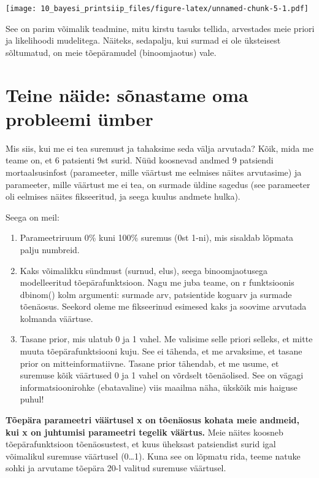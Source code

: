 \documentclass[]{book}
\begin{document}
\texttt{[image: 10\_bayesi\_printsiip\_files/figure-latex/unnamed-chunk-5-1.pdf]}

See on parim võimalik teadmine, mitu kirstu tasuks tellida, arvestades
meie priori ja likelihoodi mudelitega. Näiteks, sedapalju, kui surmad ei
ole üksteisest sõltumatud, on meie tõepäramudel (binoomjaotus) vale.

\section*{Teine näide: sõnastame oma probleemi
ümber}\label{teine-naide-sonastame-oma-probleemi-umber}

Mis siis, kui me ei tea suremust ja tahaksime seda välja arvutada? Kõik,
mida me teame on, et 6 patsienti 9st surid. Nüüd koosnevad andmed 9
patsiendi mortaalsusinfost (parameeter, mille väärtust me eelmises
näites arvutasime) ja parameeter, mille väärtust me ei tea, on surmade
üldine sagedus (see parameeter oli eelmises näites fikseeritud, ja seega
kuulus andmete hulka).

Seega on meil:

\begin{enumerate}
\def\labelenumi{\arabic{enumi}.}
\item
  Parameetriruum 0\% kuni 100\% suremus (0st 1-ni), mis sisaldab lõpmata
  palju numbreid.
\item
  Kaks võimalikku sündmust (surnud, elus), seega binoomjaotusega
  modelleeritud tõepärafunktsioon. Nagu me juba teame, on r funktsioonis
  dbinom() kolm argumenti: surmade arv, patsientide koguarv ja surmade
  tõenäosus. Seekord oleme me fikseerinud esimesed kaks ja soovime
  arvutada kolmanda väärtuse.
\item
  Tasane prior, mis ulatub 0 ja 1 vahel. Me valisime selle priori
  selleks, et mitte muuta tõepärafunktsiooni kuju. See ei tähenda, et me
  arvaksime, et tasane prior on mitteinformatiivne. Tasane prior
  tähendab, et me usume, et suremuse kõik väärtused 0 ja 1 vahel on
  võrdselt tõenäolised. See on vägagi informatsioonirohke (ebatavaline)
  viis maailma näha, ükskõik mis haiguse puhul!
\end{enumerate}

\textbf{Tõepära parameetri väärtusel x on tõenäosus kohata meie andmeid,
kui x on juhtumisi parameetri tegelik väärtus.} Meie näites koosneb
tõepärafunktsioon tõenäosustest, et kuus üheksast patsiendist surid igal
võimalikul suremuse väärtusel (0\ldots{}1). Kuna see on lõpmatu rida,
teeme natuke sohki ja arvutame tõepära 20-l valitud suremuse väärtusel.
\end{document}
